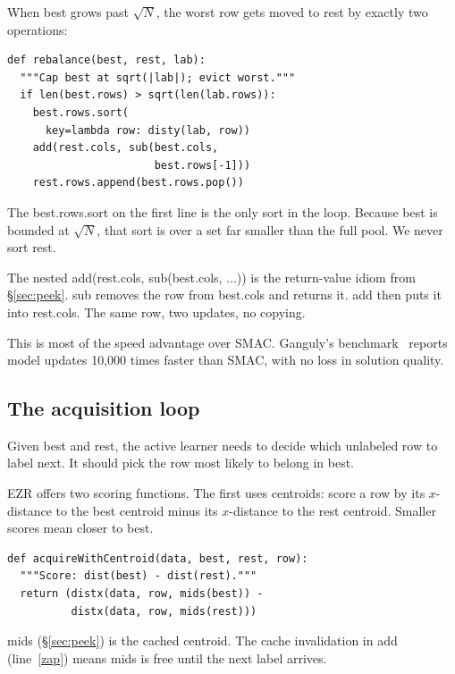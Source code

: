 \documentclass[AMA,STIX2COL]{WileyNJDv5}
\newcommand{\IT}{{\sffamily EZR}}
\begin{document}
When \textsf{best} grows past $\sqrt{N}$, the worst row gets
moved to \textsf{rest} by exactly two operations:

\begin{verbatim}
def rebalance(best, rest, lab):
  """Cap best at sqrt(|lab|); evict worst."""
  if len(best.rows) > sqrt(len(lab.rows)):
    best.rows.sort(
      key=lambda row: disty(lab, row))
    add(rest.cols, sub(best.cols,
                       best.rows[-1]))
    rest.rows.append(best.rows.pop())
\end{verbatim}

The \textsf{best.rows.sort} on the first line is the only sort
in the loop. Because \textsf{best} is bounded at $\sqrt{N}$, that
sort is over a set far smaller than the full pool. We never sort
\textsf{rest}.

The nested \textsf{add(rest.cols, sub(best.cols, ...))} is the
return-value idiom from \S\ref{sec:peek}. \textsf{sub} removes
the row from \textsf{best.cols} and returns it. \textsf{add}
then puts it into \textsf{rest.cols}. The same row, two updates,
no copying.

This is most of the speed advantage over SMAC. Ganguly's
benchmark~\cite{kashin} reports model updates 10{,}000 times
faster than SMAC, with no loss in solution quality.

\subsection{The acquisition loop}

Given \textsf{best} and \textsf{rest}, the active learner needs
to decide which unlabeled row to label next. It should pick the
row most likely to belong in \textsf{best}.

\IT{} offers two scoring functions. The first uses centroids:
score a row by its $x$-distance to the \textsf{best} centroid
minus its $x$-distance to the \textsf{rest} centroid. Smaller
scores mean closer to \textsf{best}.

\begin{verbatim}
def acquireWithCentroid(data, best, rest, row):
  """Score: dist(best) - dist(rest)."""
  return (distx(data, row, mids(best)) -
          distx(data, row, mids(rest)))
\end{verbatim}

\textsf{mids} (\S\ref{sec:peek}) is the cached centroid. The
cache invalidation in \textsf{add} (line~\ref{zap}) means
\textsf{mids} is free until the next label arrives.
\end{document}
